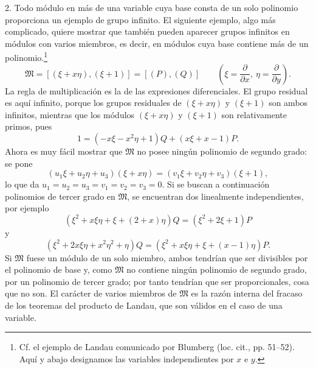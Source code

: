 \documentclass[11pt]{article}
\begin{document}
2. Todo módulo en más de una variable cuya base consta de un solo polinomio proporciona un ejemplo de grupo infinito. El siguiente ejemplo, algo más complicado, quiere mostrar que también pueden aparecer grupos infinitos en módulos con varios miembros, es decir, en módulos cuya base contiene más de un polinomio.\footnote{Cf. el ejemplo de Landau comunicado por Blumberg (loc. cit., pp. 51--52). Aquí y abajo designamos las variables independientes por $x$ e $y$.}
\[
 \mathfrak M=[(\xi+x\eta),(\xi+1)]=[(P),(Q)]
 \qquad\left(\xi=\frac{\partial}{\partial x},\ \eta=\frac{\partial}{\partial y}\right).
\]
La regla de multiplicación es la de las expresiones diferenciales. El grupo residual es aquí infinito, porque los grupos residuales de $(\xi+x\eta)$ y $(\xi+1)$ son ambos infinitos, mientras que los módulos $(\xi+x\eta)$ y $(\xi+1)$ son relativamente primos, pues
\[
 1=(-x\xi-x^2\eta+1)Q+(x\xi+x-1)P.
\]
Ahora es muy fácil mostrar que $\mathfrak M$ no posee ningún polinomio de segundo grado: se pone
\[
 (u_1\xi+u_2\eta+u_3)(\xi+x\eta)=(v_1\xi+v_2\eta+v_3)(\xi+1),
\]
lo que da $u_1=u_2=u_3=v_1=v_2=v_3=0$. Si se buscan a continuación polinomios de tercer grado en $\mathfrak M$, se encuentran dos linealmente independientes, por ejemplo
\[
 (\xi^2+x\xi\eta+\xi+(2+x)\eta)Q=(\xi^2+2\xi+1)P
\]
y
\[
 (\xi^2+2x\xi\eta+x^2\eta^2+\eta)Q
 =(\xi^2+x\xi\eta+\xi+(x-1)\eta)P.
\]
Si $\mathfrak M$ fuese un módulo de un solo miembro, ambos tendrían que ser divisibles por el polinomio de base y, como $\mathfrak M$ no contiene ningún polinomio de segundo grado, por un polinomio de tercer grado; por tanto tendrían que ser proporcionales, cosa que no son. El carácter de varios miembros de $\mathfrak M$ es la razón interna del fracaso de los teoremas del producto de Landau, que son válidos en el caso de una variable.
\end{document}
